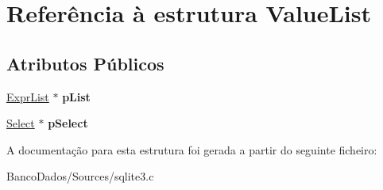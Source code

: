 \hypertarget{struct_value_list}{\section{Referência à estrutura Value\-List}
\label{struct_value_list}
}
\subsection*{Atributos Públicos}
\begin{DoxyCompactItemize}
\item 
\hypertarget{struct_value_list_a6119dd8fd520ba00ebbe9425be94184b}{\hyperlink{struct_expr_list}{Expr\-List} $\ast$ {\bfseries p\-List}}\label{struct_value_list_a6119dd8fd520ba00ebbe9425be94184b}

\item 
\hypertarget{struct_value_list_a1cce43c59968143faef1a9e457fad59a}{\hyperlink{struct_select}{Select} $\ast$ {\bfseries p\-Select}}\label{struct_value_list_a1cce43c59968143faef1a9e457fad59a}

\end{DoxyCompactItemize}


A documentação para esta estrutura foi gerada a partir do seguinte ficheiro\-:\begin{DoxyCompactItemize}
\item 
Banco\-Dados/\-Sources/sqlite3.\-c\end{DoxyCompactItemize}
